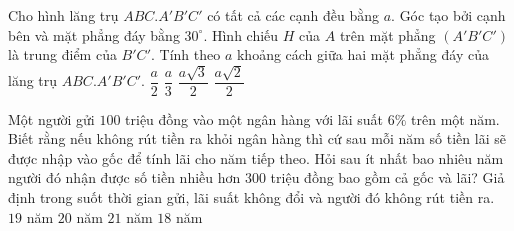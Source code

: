\begin{ex}%
	Cho hình lăng trụ $ABC.A'B'C'$ có tất cả các cạnh đều bằng $a$. Góc tạo bởi cạnh bên và mặt phẳng đáy bằng $30^\circ$. Hình chiếu $H$ của $A$ trên mặt phẳng $(A'B'C')$ là trung điểm của $B'C'$. Tính theo $a$ khoảng cách giữa hai mặt phẳng đáy của lăng trụ $ABC.A'B'C'$.
	\choice
	{\True $\dfrac{a}{2}$}
	{$\dfrac{a}{3}$}
	{$\dfrac{a\sqrt{3}}{2}$}
	{$\dfrac{a\sqrt{2}}{2}$}
\end{ex}
\begin{ex}%
	Một người gửi $100$ triệu đồng vào một ngân hàng với lãi suất $6\%$ trên một năm. Biết rằng nếu không rút tiền ra khỏi ngân hàng thì cứ sau mỗi năm số tiền lãi sẽ được nhập vào gốc để tính lãi cho năm tiếp theo. Hỏi sau ít nhất bao nhiêu năm người đó nhận được số tiền nhiều hơn $300$ triệu đồng bao gồm cả gốc và lãi? Giả định trong suốt thời gian gửi, lãi suất không đổi và người đó không rút tiền ra.
	\choice
	{\True $19$ năm}
	{$20$ năm}
	{$21$ năm}
	{$18$ năm}
\end{ex}
